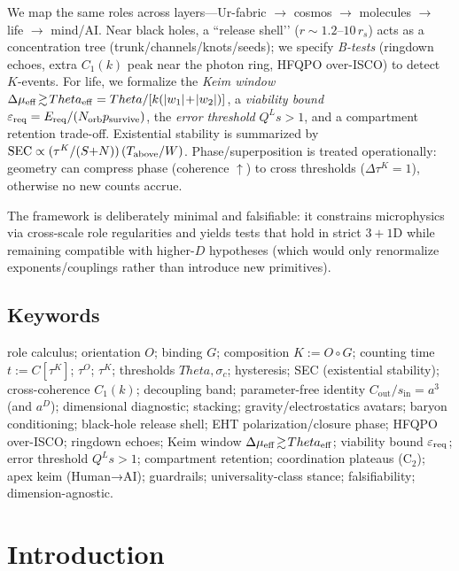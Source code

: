 \documentclass[12pt,a4paper,oneside]{scrreprt}
\def\Theta{Theta}%
\begin{document}
We map the same roles across layers—Ur-fabric $\rightarrow$ cosmos $\rightarrow$ molecules $\rightarrow$ life $\rightarrow$ mind/AI.
Near black holes, a “release shell’’ ($r\!\sim\!1.2$–$10\,r_s$) acts as a concentration tree (trunk/channels/knots/seeds); we specify \emph{B-tests} (ringdown echoes, extra $C_1(k)$ peak near the photon ring, HFQPO over-ISCO) to detect $K$-events.
For life, we formalize the \emph{Keim window} $\Delta\mu_{\rm eff}\!\gtrsim\!\Theta_{\rm eff}=\Theta/[k(|w_1|\!+\!|w_2|)]$, a \emph{viability bound}
$\varepsilon_{\rm req}=E_{\rm req}/(N_{\rm orb}p_{\rm survive})$,
the \emph{error threshold} $Q^L s>1$, and a compartment retention trade-off.
Existential stability is summarized by
$\mathrm{SEC}\propto (\tau^K/(S{+}N))\,(T_{\rm above}/W)$.
Phase/superposition is treated operationally: geometry can compress phase (coherence $\uparrow$) to cross thresholds ($\Delta\tau^K=1$), otherwise no new counts accrue.

The framework is deliberately minimal and falsifiable: it constrains microphysics via cross-scale role regularities and yields tests that hold in strict $3{+}1$D while remaining compatible with higher-$D$ hypotheses (which would only renormalize exponents/couplings rather than introduce new primitives).

\chapter*{Keywords}
role calculus; orientation $O$; binding $G$; composition $K{:=}O\!\circ G$; counting time $t{:=}C[\tau^K]$; $\tau^O$; $\tau^K$; thresholds $\Theta,\sigma_c$; hysteresis; SEC (existential stability); cross-coherence $C_1(k)$; decoupling band; parameter-free identity $C_{\mathrm{out}}/s_{\mathrm{in}}=a^{3}$ (and $a^{D}$); dimensional diagnostic; stacking; gravity/electrostatics avatars; baryon conditioning; black-hole release shell; EHT polarization/closure phase; HFQPO over-ISCO; ringdown echoes; Keim window $\Delta\mu_{\rm eff}\!\gtrsim\!\Theta_{\rm eff}$; viability bound $\varepsilon_{\rm req}$; error threshold $Q^L s>1$; compartment retention; coordination plateaus (C$_2$); apex keim (Human→AI); guardrails; universality-class stance; falsifiability; dimension-agnostic.

\tableofcontents
\listoffigures
\listoftables
\clearpage
{}

\part{Introduction}
\end{document}
